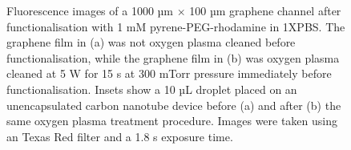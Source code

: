 \documentclass[
  a4paper,
]{scrbook}
\begin{document}
\begin{figure}
\begin{minipage}[t]{0.47\linewidth}
{{}

}

\subcaption{\label{fig-attachment-post-plasma}}
\end{minipage}%

\caption{\label{fig-hydrophobicity}Fluorescence images of a 1000 µm
\(\times\) 100 µm graphene channel after functionalisation with 1 mM
pyrene-PEG-rhodamine in 1XPBS. The graphene film in (a) was not oxygen
plasma cleaned before functionalisation, while the graphene film in (b)
was oxygen plasma cleaned at 5 W for 15 s at 300 mTorr pressure
immediately before functionalisation. Insets show a 10 µL droplet placed
on an unencapsulated carbon nanotube device before (a) and after (b) the
same oxygen plasma treatment procedure. Images were taken using an Texas
Red filter and a 1.8 s exposure time.}

\end{figure}
\end{document}
